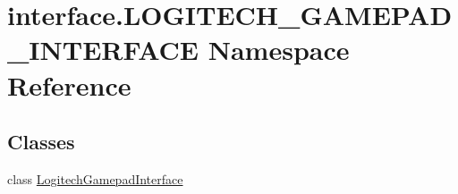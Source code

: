 \hypertarget{namespaceinterface_1_1LOGITECH__GAMEPAD__INTERFACE}{}\section{interface.\+L\+O\+G\+I\+T\+E\+C\+H\+\_\+\+G\+A\+M\+E\+P\+A\+D\+\_\+\+I\+N\+T\+E\+R\+F\+A\+C\+E Namespace Reference}
\label{namespaceinterface_1_1LOGITECH__GAMEPAD__INTERFACE}
\subsection*{Classes}
\begin{DoxyCompactItemize}
\item 
class \hyperlink{classinterface_1_1LOGITECH__GAMEPAD__INTERFACE_1_1LogitechGamepadInterface}{Logitech\+Gamepad\+Interface}
\end{DoxyCompactItemize}
